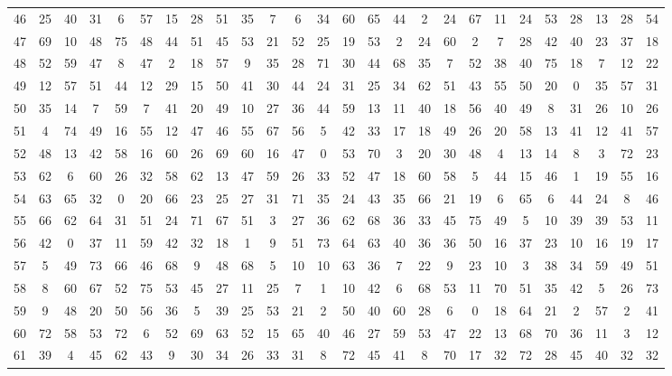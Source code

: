 \begin{table}
\begin{tabular}{c c c c c c c c c c c c c c c c c c c c c c c c c c }
46 & 25 & 40 & 31 & 6 & 57 & 15 & 28 & 51 & 35 & 7 & 6 & 34 & 60 & 65 & 44 & 2 & 24 & 67 & 11 & 24 & 53 & 28 & 13 & 28 & 54 \\
47 & 69 & 10 & 48 & 75 & 48 & 44 & 51 & 45 & 53 & 21 & 52 & 25 & 19 & 53 & 2 & 24 & 60 & 2 & 7 & 28 & 42 & 40 & 23 & 37 & 18 \\
48 & 52 & 59 & 47 & 8 & 47 & 2 & 18 & 57 & 9 & 35 & 28 & 71 & 30 & 44 & 68 & 35 & 7 & 52 & 38 & 40 & 75 & 18 & 7 & 12 & 22 \\
49 & 12 & 57 & 51 & 44 & 12 & 29 & 15 & 50 & 41 & 30 & 44 & 24 & 31 & 25 & 34 & 62 & 51 & 43 & 55 & 50 & 20 & 0 & 35 & 57 & 31 \\
50 & 35 & 14 & 7 & 59 & 7 & 41 & 20 & 49 & 10 & 27 & 36 & 44 & 59 & 13 & 11 & 40 & 18 & 56 & 40 & 49 & 8 & 31 & 26 & 10 & 26 \\
51 & 4 & 74 & 49 & 16 & 55 & 12 & 47 & 46 & 55 & 67 & 56 & 5 & 42 & 33 & 17 & 18 & 49 & 26 & 20 & 58 & 13 & 41 & 12 & 41 & 57 \\
52 & 48 & 13 & 42 & 58 & 16 & 60 & 26 & 69 & 60 & 16 & 47 & 0 & 53 & 70 & 3 & 20 & 30 & 48 & 4 & 13 & 14 & 8 & 3 & 72 & 23 \\
53 & 62 & 6 & 60 & 26 & 32 & 58 & 62 & 13 & 47 & 59 & 26 & 33 & 52 & 47 & 18 & 60 & 58 & 5 & 44 & 15 & 46 & 1 & 19 & 55 & 16 \\
54 & 63 & 65 & 32 & 0 & 20 & 66 & 23 & 25 & 27 & 31 & 71 & 35 & 24 & 43 & 35 & 66 & 21 & 19 & 6 & 65 & 6 & 44 & 24 & 8 & 46 \\
55 & 66 & 62 & 64 & 31 & 51 & 24 & 71 & 67 & 51 & 3 & 27 & 36 & 62 & 68 & 36 & 33 & 45 & 75 & 49 & 5 & 10 & 39 & 39 & 53 & 11 \\
56 & 42 & 0 & 37 & 11 & 59 & 42 & 32 & 18 & 1 & 9 & 51 & 73 & 64 & 63 & 40 & 36 & 36 & 50 & 16 & 37 & 23 & 10 & 16 & 19 & 17 \\
57 & 5 & 49 & 73 & 66 & 46 & 68 & 9 & 48 & 68 & 5 & 10 & 10 & 63 & 36 & 7 & 22 & 9 & 23 & 10 & 3 & 38 & 34 & 59 & 49 & 51 \\
58 & 8 & 60 & 67 & 52 & 75 & 53 & 45 & 27 & 11 & 25 & 7 & 1 & 10 & 42 & 6 & 68 & 53 & 11 & 70 & 51 & 35 & 42 & 5 & 26 & 73 \\
59 & 9 & 48 & 20 & 50 & 56 & 36 & 5 & 39 & 25 & 53 & 21 & 2 & 50 & 40 & 60 & 28 & 6 & 0 & 18 & 64 & 21 & 2 & 57 & 2 & 41 \\
60 & 72 & 58 & 53 & 72 & 6 & 52 & 69 & 63 & 52 & 15 & 65 & 40 & 46 & 27 & 59 & 53 & 47 & 22 & 13 & 68 & 70 & 36 & 11 & 3 & 12 \\
61 & 39 & 4 & 45 & 62 & 43 & 9 & 30 & 34 & 26 & 33 & 31 & 8 & 72 & 45 & 41 & 8 & 70 & 17 & 32 & 72 & 28 & 45 & 40 & 32 & 32 \\

\end{tabular}
\end{table}
